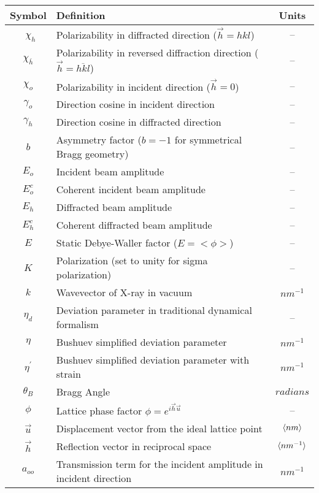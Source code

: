 \begin{table}
\begin{longtable}{|c|l|c|}
\hline
\textbf{Symbol}               		& \textbf{Definition} &\textbf{Units} \\
\hline\
$\chi_h$               & Polarizability in diffracted direction ($\vec{h} = hkl$)  &--\\
$\chi_{\overline{h}}$  & Polarizability in reversed diffraction direction ($\vec{h}=\overline{hkl}$) &--\\
$\chi_o$       		 & Polarizability in incident direction ($\vec{h} =0$) &--\\
$\gamma_o $      	 & Direction cosine in incident direction &--\\
$\gamma_h$		 & Direction cosine in diffracted direction &--\\
$b$           		& Asymmetry factor ($b = -1$ for symmetrical Bragg geometry) &--\\
$E_o$          		& Incident beam amplitude & --\\
$E^c_o$         	& Coherent incident beam amplitude &--\\
$E_h$          		& Diffracted beam amplitude &--\\
$E^c_h$        	 & Coherent diffracted beam amplitude &--\\
$E$          		 & Static Debye-Waller factor ($E=<\phi>$) &--\\
$K$           		& Polarization (set to unity for sigma polarization) &--\\
$k$        		& Wavevector of X-ray in vacuum  &$ nm^{-1}$\\
$\eta_d$       	 & Deviation parameter in traditional dynamical formalism &--\\
$\eta$	 	& Bushuev simplified deviation parameter  &$ nm^{-1}$\\
$\eta^\prime$  	& Bushuev simplified deviation parameter with strain  &$ nm^{-1}$\\
$\theta_B$       	& Bragg Angle & $radians$ \\
$\phi$       	  	& Lattice phase factor $\phi = e^{i\vec{h} \vec{u}}$&--\\
$\vec{u}$        	& Displacement vector from the ideal lattice point & $\langle nm\rangle$\\
$\vec{h}$        	& Reflection vector in reciprocal space & $\langle nm^{-1}\rangle$\\
$a_{oo}$        & Transmission term for the incident amplitude in incident direction & $ nm^{-1}$ \\

\end{longtable}
\end{table}

